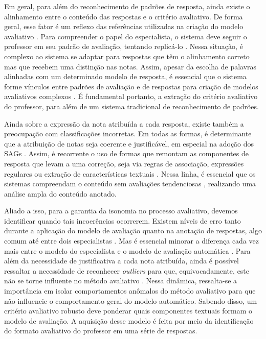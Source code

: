 Em geral, para além do reconhecimento de padrões de resposta, ainda existe o alinhamento entre o conteúdo das respostas e o critério avaliativo. De forma geral, esse fator é um reflexo das referências utilizadas na criação do modelo avaliativo \cite{krithika2015}. Para compreender o papel do especialista, o sistema deve seguir o professor em seu padrão de avaliação, tentando replicá-lo \cite{jordan2012, funayama2020}. Nessa situação, é complexo ao sistema se adaptar para respostas que têm o alinhamento correto mas que recebem uma distinção nas notas. Assim, apesar da escolha de palavras alinhadas com um determinado modelo de resposta, é essencial que o sistema forme vínculos entre padrões de avaliação e de respostas para criação de modelos avaliativos complexos \cite{higgins2014}. É fundamental portanto, a extração do critério avaliativo do professor, para além de um sistema tradicional de reconhecimento de padrões.

Ainda sobre a expressão da nota atribuída a cada resposta, existe também a preocupação com classificações incorretas. Em todas as formas, é determinante que a atribuição de notas seja coerente e justificável, em especial na adoção dos SAGs \cite{funayama2020}. Assim, é recorrente o uso de formas que remontam as componentes de resposta que levam a uma correção, seja via regras de associação, expressões regulares ou extração de características textuais \cite{chakraborty2017, kumar2019}. Nessa linha, é essencial que os sistemas compreendam o conteúdo sem avaliações tendenciosas \cite{azad2020}, realizando uma análise ampla do conteúdo anotado.

Aliado a isso, para a garantia da isonomia no processo avaliativo, devemos identificar quando tais incoerências ocorrerem. Existem níveis de erro tanto durante a aplicação do modelo de avaliação quanto na anotação de respostas, algo comum até entre dois especialistas \cite{artstein2008, pado2021}. Mas é essencial minorar a diferença cada vez mais entre o modelo do especialista e o modelo de avaliação automática \cite{condor2020}. Para além da necessidade de justificativa a cada nota atribuída, ainda é possível ressaltar a necessidade de reconhecer \textit{outliers} para que, equivocadamente, este não se torne influente no método avaliativo \cite{ding2020}. Nessa dinâmica, ressalta-se a importância em isolar comportamentos anômalos do método avaliativo para que não influencie o comportamento geral do modelo automático. Sabendo disso, um critério avaliativo robusto deve ponderar quais componentes textuais formam o modelo de avaliação. A aquisição desse modelo é feita por meio da identificação do formato avaliativo do professor em uma série de respostas. 

